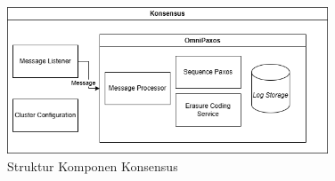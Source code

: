 \begin{figure}[ht]
    \centering
    \includegraphics[width=0.85\textwidth]{resources/chapter-3/consensus-architecture.png}
    \caption{Struktur Komponen Konsensus}
    \label{fig:consensus-component-structure}
\end{figure}
